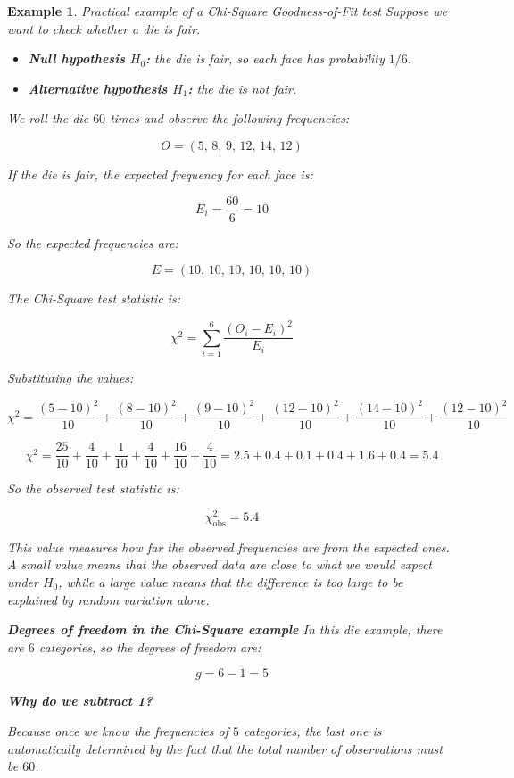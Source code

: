 \documentclass[11pt]{article}
\theoremstyle{smallexample}
\newtheorem{example}{Example}[section]
\newcommand{\vs}{\vspace{0.2\baselineskip}}
\begin{document}
\begin{example}{Practical example of a Chi-Square Goodness-of-Fit test}
Suppose we want to check whether a die is fair.

\begin{itemize}
    \item \textbf{Null hypothesis \(H_0\):} the die is fair, so each face has probability \(1/6\).
    \item \textbf{Alternative hypothesis \(H_1\):} the die is not fair.
\end{itemize}

We roll the die \(60\) times and observe the following frequencies:

\[
O = (5,\,8,\,9,\,12,\,14,\,12)
\]

If the die is fair, the expected frequency for each face is:

\[
E_i=\frac{60}{6}=10
\]

So the expected frequencies are:

\[
E = (10,\,10,\,10,\,10,\,10,\,10)
\]

The Chi-Square test statistic is:

\[
\chi^2 = \sum_{i=1}^{6}\frac{(O_i-E_i)^2}{E_i}
\]

Substituting the values:

\[
\chi^2 =
\frac{(5-10)^2}{10}+
\frac{(8-10)^2}{10}+
\frac{(9-10)^2}{10}+
\frac{(12-10)^2}{10}+
\frac{(14-10)^2}{10}+
\frac{(12-10)^2}{10}
\]

\[
\chi^2 =
\frac{25}{10}+\frac{4}{10}+\frac{1}{10}+\frac{4}{10}+\frac{16}{10}+\frac{4}{10}
= 2.5+0.4+0.1+0.4+1.6+0.4 = 5.4
\]

So the observed test statistic is:

\[
\chi^2_{\text{obs}}=5.4
\]

This value measures how far the observed frequencies are from the expected ones. A small value means that the observed data are close to what we would expect under \(H_0\), while a large value means that the difference is too large to be explained by random variation alone.

\vs


\textbf{Degrees of freedom in the Chi-Square example}
In this die example, there are \(6\) categories, so the degrees of freedom are:

\[
g = 6-1 = 5
\]

\textbf{Why do we subtract 1?}

Because once we know the frequencies of \(5\) categories, the last one is automatically determined by the fact that the total number of observations must be \(60\).


\end{example}
\end{document}
